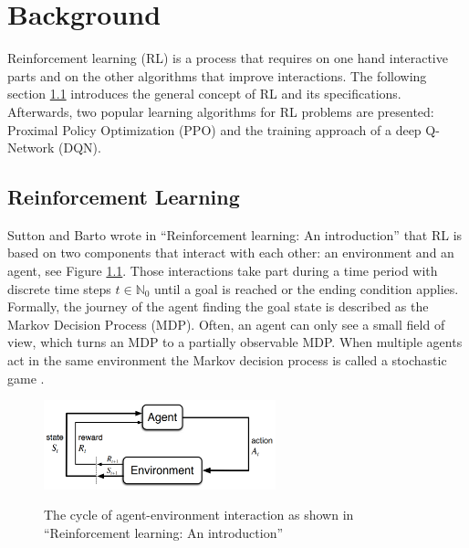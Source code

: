 \chapter{Background}\label{sec:Background}
Reinforcement learning (RL) is a process that requires on one hand interactive parts and on the other algorithms that improve interactions. The following section \ref{reinforcement_learning} introduces the general concept of RL and its specifications. Afterwards, two popular learning algorithms for RL problems are presented: Proximal Policy Optimization (PPO) and the training approach of a deep Q-Network (DQN).

\section{Reinforcement Learning}\label{reinforcement_learning}
Sutton and Barto wrote in ``Reinforcement learning: An introduction'' \cite{suba18} that RL is based on two components that interact with each other: an environment and an agent, see Figure \ref{fig:rl_cycle}. Those interactions take part during a time period with discrete time steps $t\in\mathbb{N}_0$ until a goal is reached or the ending condition applies. Formally, the journey of the agent finding the goal state is described as the Markov Decision Process (MDP). Often, an agent can only see a small field of view, which turns an MDP to a partially observable MDP.
When multiple agents act in the same environment the Markov decision process is called a stochastic game \cite{buba10}.
\begin{figure}[hpbt]
    \centering
    \includegraphics[width=0.6\textwidth]{pictures/RLInteractionSB}\\
    \caption[Reinforcement Learning Cycle]{The cycle of agent-environment interaction as
        shown in ``Reinforcement learning: An introduction'' \cite{suba18}}\label{fig:rl_cycle}
\end{figure}

